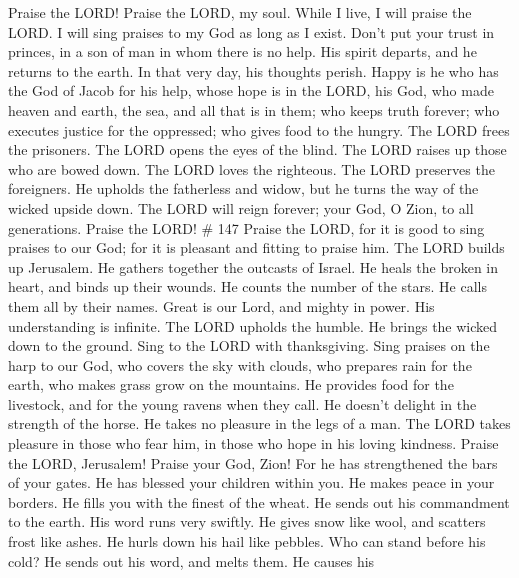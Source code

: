  Praise the LORD! Praise the LORD, my soul. 
While I live, I will praise the LORD. I will sing praises to my God as
long as I exist.  Don't put your trust in princes, in a
son of man in whom there is no help.  His spirit departs,
and he returns to the earth. In that very day, his thoughts perish.
 Happy is he who has the God of Jacob for his help, whose
hope is in the LORD, his God,  who made heaven and earth,
the sea, and all that is in them; who keeps truth forever;
 who executes justice for the oppressed; who gives food to
the hungry. The LORD frees the prisoners.  The LORD opens
the eyes of the blind. The LORD raises up those who are bowed down. The
LORD loves the righteous.  The LORD preserves the
foreigners. He upholds the fatherless and widow, but he turns the way of
the wicked upside down.  The LORD will reign forever;
your God, O Zion, to all generations. Praise the LORD! \# 147
 Praise the LORD, for it is good to sing praises to our
God; for it is pleasant and fitting to praise him.  The
LORD builds up Jerusalem. He gathers together the outcasts of Israel.
 He heals the broken in heart, and binds up their wounds.
 He counts the number of the stars. He calls them all by
their names.  Great is our Lord, and mighty in power. His
understanding is infinite.  The LORD upholds the humble.
He brings the wicked down to the ground.  Sing to the LORD
with thanksgiving. Sing praises on the harp to our God, 
who covers the sky with clouds, who prepares rain for the earth, who
makes grass grow on the mountains.  He provides food for
the livestock, and for the young ravens when they call. 
He doesn't delight in the strength of the horse. He takes no pleasure in
the legs of a man.  The LORD takes pleasure in those who
fear him, in those who hope in his loving kindness. 
Praise the LORD, Jerusalem! Praise your God, Zion!  For
he has strengthened the bars of your gates. He has blessed your children
within you.  He makes peace in your borders. He fills you
with the finest of the wheat.  He sends out his
commandment to the earth. His word runs very swiftly.  He
gives snow like wool, and scatters frost like ashes.  He
hurls down his hail like pebbles. Who can stand before his cold?
 He sends out his word, and melts them. He causes his
